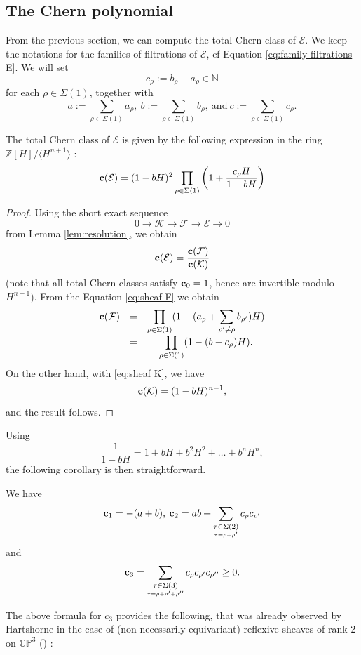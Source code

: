 \documentclass[a4paper,10pt]{amsart}
\theoremstyle{plain}{
    \newtheorem{theorem}{Theorem}[section]
    \newtheorem{lemma}[theorem]{Lemma}
    \newtheorem{corollary}[theorem]{Corollary}
    \newtheorem{proposition}[theorem]{Proposition}
    \newtheorem{conjecture}[theorem]{Conjecture}
}
\theoremstyle{definition}{
    \newtheorem{definition}[theorem]{Definition}
    \newtheorem{defn-thm}[theorem]{Definition-Theorem}
    \newtheorem{example}[theorem]{Example}
    \newtheorem{notation}[theorem]{Notation}
}
\theoremstyle{remark}{
    \newtheorem{remark}[theorem]{Remark}
    \newtheorem{problem}[theorem]{Problem}
    \newtheorem{question}[theorem]{Question}
}
\def\uc{{\bf c}}
\def\cF{\mathcal{F}}
\def\cE{\mathcal{E}}
\def\cK{\mathcal{K}}
\def\Z{\mathbb{Z}}
\def\N{\mathbb{N}}
\def\P{\mathbb{P}}
\def\C{\mathbb{C}}
\begin{document}
\subsection{The Chern polynomial}
\label{sec:chern polynomial}
From the previous section, we can compute the total Chern class of $\cE$. We keep the notations for the families of filtrations of $\cE$, cf Equation \eqref{eq:family filtrations E}. We will set $$c_\rho:=b_\rho-a_\rho\in\N$$ for each $\rho\in\Sigma(1)$, together with
$$
a:=\sum_{\rho\in \Sigma(1)} a_\rho,\: b:=\sum_{\rho\in \Sigma(1)} b_\rho,\: \mathrm{and} \:
c:=\sum_{\rho\in \Sigma(1)} c_\rho.
$$
\begin{proposition}
 \label{prop:chern class}
 The total Chern class of $\cE$ is given by the following expression in the ring $\Z[H]/\langle H^{n+1}\rangle$ :
 \begin{equation}
  \label{eq:total Chern class}
 \displaystyle \uc(\cE)=(1-b H)^2 \prod_{\rho\in\Sigma(1)}\left(1+ \frac{c_\rho H}{1-bH}\right)
 \end{equation}
\end{proposition}
\begin{proof}
 Using the short exact sequence
 $$
 0\to\cK\to\cF\to\cE\to 0
 $$
 from Lemma \ref{lem:resolution}, we obtain
 $$
 \uc(\cE)=\frac{\uc(\cF)}{\uc(\cK)}
 $$
 (note that all total Chern classes satisfy $\uc_0=1$, hence are invertible modulo $H^{n+1}$). From the Equation \eqref{eq:sheaf F} we obtain
 $$
 \begin{array}{ccc}
 \uc(\cF) & = & \displaystyle\prod_{\rho\in\Sigma(1)}(1-(a_\rho+\sum_{\rho'\neq \rho}b_{\rho'})H)\\
          & = &\displaystyle \prod_{\rho\in\Sigma(1)}(1-(b-c_\rho)H).
 \end{array}
 $$
 On the other hand, with \eqref{eq:sheaf K}, we have
 $$
 \uc(\cK)=(1-bH)^{n-1},
 $$
 and the result follows.
\end{proof}
Using
$$
\frac{1}{1-bH}=1+bH+b^2H^2+\ldots+b^nH^n,
$$
the following corollary is then straightforward.
\begin{corollary}
 \label{cor:first chern classes}
 We have
 $$
 \uc_1=-(a+b),\: \uc_2=ab+\sum_{\underset{\tau=\rho+\rho'}{\tau\in\Sigma(2)}}c_{\rho}c_{\rho'}
 $$
 and 
 $$
 \uc_3=\sum_{\underset{\tau=\rho+\rho'+\rho''}{\tau\in\Sigma(3)}}c_{\rho}c_{\rho'}c_{\rho''}\geq 0.
 $$
\end{corollary}
The above formula for $c_3$ provides the following, that was already observed by Hartshorne in the case of (non necessarily equivariant) reflexive sheaves of rank $2$ on $\C\P^3$ (\cite[Proposition 2.6]{Har80}) :
\end{document}
